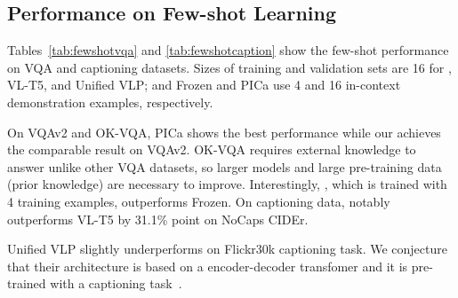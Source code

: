 \begin{table}[tb!]
\centering
\caption{\textbf{5-way miniImageNet results.} We evaluate \method\xspace in a generative manner. The shot represents the number of training examples per class.}
\label{tab:fewshotimage}
\end{table}

\subsection{Performance on Few-shot Learning}
\label{sec:few}




Tables~\ref{tab:fewshotvqa} and  \ref{tab:fewshotcaption} show the few-shot performance on VQA and captioning datasets.
Sizes of training and validation sets are 16 for \method, VL-T5, and Unified VLP; and Frozen and PICa use 4 and 16 in-context demonstration examples, respectively.


On VQAv2 and OK-VQA, PICa shows the best performance while our \method achieves the comparable result on VQAv2.
OK-VQA requires external knowledge to answer unlike other VQA datasets, so larger models and large pre-training data (prior knowledge) are necessary to improve.
Interestingly, \method, which is trained with 4 training examples, outperforms Frozen.
On captioning data, \method notably outperforms VL-T5 by 31.1\% point on NoCaps CIDEr.

Unified VLP slightly underperforms \method\xspace on Flickr30k captioning task.
We conjecture that their architecture is based on a encoder-decoder transfomer and it is pre-trained with a captioning task~\cite{zhou2020unified}.



